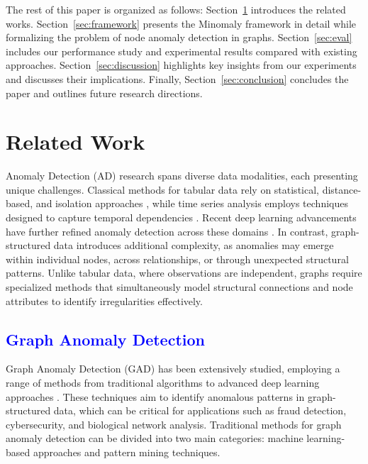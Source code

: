 \documentclass[preprint,12pt]{elsarticle}
\newcommand{\new}[1]{\textcolor{blue}{#1}}
\theoremstyle{plain}
\theoremstyle{definition}
\theoremstyle{remark}
\begin{document}
The rest of this paper is organized as follows:
{Section~\ref{sec:relatedworks}} introduces the related works.
{Section~\ref{sec:framework}} presents the Minomaly framework in detail while formalizing the problem of node anomaly detection in graphs.
{Section~\ref{sec:eval}} includes our performance study and experimental results compared with existing approaches. {Section~\ref{sec:discussion}} highlights key insights from our experiments and discusses their implications. Finally, {Section~\ref{sec:conclusion}} concludes the paper and outlines future research directions.

\section{Related Work}
\label{sec:relatedworks}

Anomaly Detection (AD) research spans diverse data modalities, each presenting unique challenges. Classical methods for tabular data rely on statistical, distance-based, and isolation approaches \cite{Ruff_2021,nassif2021machine,han2022adbench,agrawal2015survey}, while time series analysis employs techniques designed to capture temporal dependencies \cite{blazquez2021review,schmidl2022anomaly,benkabou2021local,benkabou2018unsupervised}. Recent deep learning advancements have further refined anomaly detection across these domains \cite{chalapathy2019deep,choi2021deep,Ma_2023}. In contrast, graph-structured data introduces additional complexity, as anomalies may emerge within individual nodes, across relationships, or through unexpected structural patterns. Unlike tabular data, where observations are independent, graphs require specialized methods that simultaneously model structural connections and node attributes to identify irregularities effectively.

\subsection{\new{Graph Anomaly Detection}}

Graph Anomaly Detection (GAD) has been extensively studied, employing a range of methods from traditional algorithms to advanced deep learning approaches \cite{Ma_2023}. These techniques aim to identify anomalous patterns in graph-structured data, which can be critical for applications such as fraud detection, cybersecurity, and biological network analysis. Traditional methods for graph anomaly detection can be divided into two main categories: machine learning-based approaches and pattern mining techniques.
\end{document}
